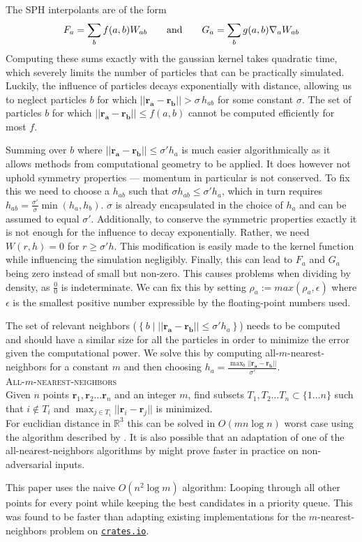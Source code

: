 \documentclass[../main.tex]{subfiles}
\begin{document}
The SPH interpolants are of the form
\[ F_a = \sum_b f(a, b) W_{ab} \qquad\textnormal{and}\qquad G_a = \sum_b g(a, b) \nabla_a W_{ab} \]
Computing these sums exactly with the gaussian kernel takes quadratic time, which severely limits
the number of particles that can be practically simulated. Luckily, the influence of particles
decays exponentially with distance, allowing us to neglect particles $b$ for which
$||\bm{r_a} - \bm{r_b}|| > \sigma \,  h_{ab}$ for some constant $\sigma$. The set of particles $b$
for which $||\bm{r_a} - \bm{r_b}|| \le f(a, b)$ cannot be computed efficiently for most $f$.

Summing over $b$ where $||\bm{r_a} - \bm{r_b}|| \le \sigma' h_a$ is much easier algorithmically as
it allows methods from computational geometry to be applied. It does however not uphold symmetry
properties --- momentum in particular is not conserved. To fix this we need to choose a $h_{ab}$
such that $\sigma h_{ab} \le \sigma' h_a$, which in turn requires
$h_{ab} = \frac{\sigma'}{\sigma} \min(h_a, h_b)$. $\sigma$ is already encapsulated in the choice
of $h_a$ and can be assumed to equal $\sigma'$. Additionally, to conserve the symmetric properties
exactly it is not enough for the influence to decay exponentially. Rather, we need $W(r, h) = 0$
for $r \ge \sigma'h$. This modification is easily made to the kernel function while influencing the
simulation negligibly. Finally, this can lead to $F_a$ and $G_a$ being zero instead of small but
non-zero. This causes problems when dividing by density, as $\frac{0}{0}$ is indeterminate. We can
fix this by setting $\rho_a := max(\rho_a, \epsilon)$ where $\epsilon$ is the smallest positive
number expressible by the floating-point numbers used.

The set of relevant neighbors ($\left\{ b \mid ||\bm{r_a} - \bm{r_b}|| \le \sigma' h_a \right\}$)
needs to be computed and should have a similar size for all the particles in order to minimize the
error given the computational power. We solve this by computing all-$m$-nearest-neighbors for a
constant $m$ and then choosing $h_a = \frac{\max_b ||\bm{r_a} - \bm{r_b}||}{\sigma'}$.
\\

\textsc{All-$m$-nearest-neighbors}
\\
Given $n$ points $\bm{r}_1, \bm{r}_2 \dotsc \bm{r}_n$ and an integer $m$, find subsets
$T_1, T_2 \dotsc T_n \subset \{ 1 \dots n \}$ such that $i \notin T_i$ and
$\displaystyle \max_{j \in T_i} ||\bm{r}_i - \bm{r}_j||$ is minimized.
\\

For euclidian distance in $\mathbb{R}^3$ this can be solved in $O(m n \log n)$ worst case using the
algorithm described by \textcite{neighbors}. It is also possible that an adaptation of one of the
all-nearest-neighbors algorithms by \textcite{random_neighbors} might prove faster in practice on
non-adversarial inputs.

This paper uses the naive $O(n^2 \log m)$ algorithm: Looping through all other points for every
point while keeping the best candidates in a priority queue. This was found to be faster than
adapting existing implementations for the $m$-nearest-neighbors problem on
\href{https://crates.io}{\texttt{crates.io}}.
\end{document}
